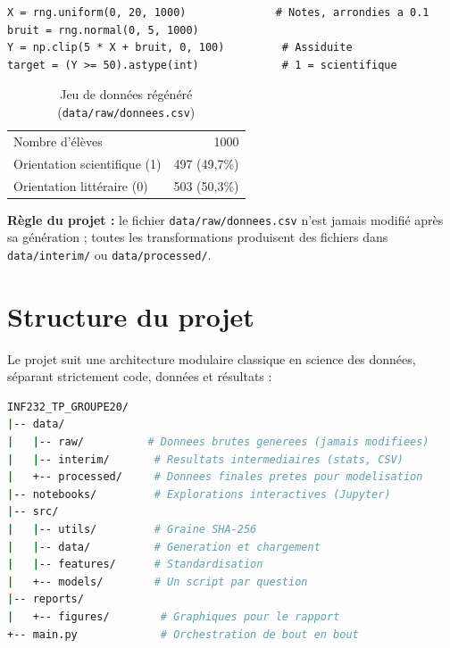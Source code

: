 \documentclass[11pt,a4paper]{article}
\begin{document}
\begin{lstlisting}
X = rng.uniform(0, 20, 1000)              # Notes, arrondies a 0.1
bruit = rng.normal(0, 5, 1000)
Y = np.clip(5 * X + bruit, 0, 100)         # Assiduite
target = (Y >= 50).astype(int)             # 1 = scientifique
\end{lstlisting}

\begin{table}[H]
\centering
\begin{tabular}{|l|r|}
\hline
Nombre d'élèves & 1000 \\
Orientation scientifique (1) & 497 (49,7\%) \\
Orientation littéraire (0) & 503 (50,3\%) \\
\hline
\end{tabular}
\caption{Jeu de données régénéré (\texttt{data/raw/donnees.csv})}
\end{table}

\textbf{Règle du projet :} le fichier \texttt{data/raw/donnees.csv} n'est jamais modifié
après sa génération ; toutes les transformations produisent des fichiers dans
\texttt{data/interim/} ou \texttt{data/processed/}.

\section{Structure du projet}

Le projet suit une architecture modulaire classique en science des données,
séparant strictement code, données et résultats :

\begin{lstlisting}[language=bash]
INF232_TP_GROUPE20/
|-- data/
|   |-- raw/          # Donnees brutes generees (jamais modifiees)
|   |-- interim/       # Resultats intermediaires (stats, CSV)
|   +-- processed/     # Donnees finales pretes pour modelisation
|-- notebooks/         # Explorations interactives (Jupyter)
|-- src/
|   |-- utils/         # Graine SHA-256
|   |-- data/          # Generation et chargement
|   |-- features/      # Standardisation
|   +-- models/        # Un script par question
|-- reports/
|   +-- figures/        # Graphiques pour le rapport
+-- main.py             # Orchestration de bout en bout
\end{lstlisting}
\end{document}
